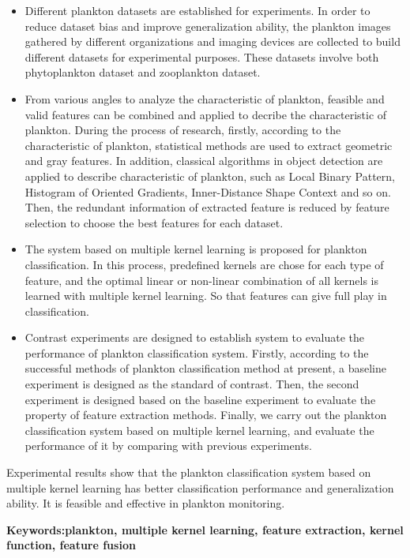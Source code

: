 {   \begin{itemize}
   \item Different plankton datasets are established for experiments. In order to reduce dataset bias and improve generalization ability, the plankton images gathered by different organizations and imaging devices are collected to build different datasets for experimental purposes. These datasets involve both phytoplankton dataset and zooplankton dataset.
   \item From various angles to analyze the characteristic of plankton, feasible and valid features can be combined and applied to decribe the characteristic of plankton. During the process of research, firstly, according to the characteristic of plankton, statistical methods are used to extract geometric and gray features. In addition, classical algorithms in object detection are applied to describe characteristic of plankton, such as Local Binary Pattern, Histogram of Oriented Gradients, Inner-Distance Shape Context and so on. Then, the redundant information of extracted feature is reduced by feature selection to choose the best features for each dataset.
   \item The system based on multiple kernel learning is proposed for plankton classification. In this process, predefined kernels are chose for each type of feature, and the optimal linear or non-linear combination of all kernels is learned with multiple kernel learning. So that features can give full play in classification.
   \item Contrast experiments are designed to establish system to evaluate the performance of plankton classification system. Firstly, according to the successful methods of plankton classification method at present, a baseline experiment is designed as the standard of contrast. Then, the second experiment is designed based on the baseline experiment to evaluate the property of feature extraction methods. Finally, we carry out the plankton classification system based on multiple kernel learning, and evaluate the performance of it by comparing with previous experiments.
   \end{itemize}

   Experimental results show that the plankton classification system based on multiple kernel learning has better classification performance and generalization ability. It is feasible and effective in plankton monitoring.
}
\vskip12bp
{\xiaosi\heiti\noindent 
\textbf{Keywords:\enskip plankton, multiple kernel learning, feature extraction, kernel function, feature fusion}}
